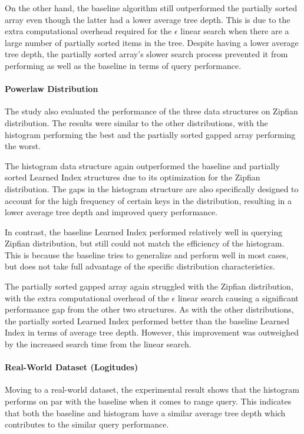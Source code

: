 \documentclass[11pt,a4paper]{article}
\newcommand{\learnindex}{\textsf{Learned Index}\xspace}
\begin{document}
On the other hand, the baseline algorithm still outperformed the partially sorted array even though the latter had a lower average tree depth. This is due to the extra computational overhead required for the $\epsilon$ linear search when there are a large number of partially sorted items in the tree. Despite having a lower average tree depth, the partially sorted array's slower search process prevented it from performing as well as the baseline in terms of query performance.

\paragraph{Powerlaw Distribution}
The study also evaluated the performance of the three data structures on Zipfian distribution. The results were similar to the other distributions, with the histogram performing the best and the partially sorted gapped array performing the worst.

The histogram data structure again outperformed the baseline and partially sorted \learnindex structures due to its optimization for the Zipfian distribution. The gaps in the histogram structure are also specifically designed to account for the high frequency of certain keys in the distribution, resulting in a lower average tree depth and improved query performance.

In contrast, the baseline \learnindex performed relatively well in querying Zipfian distribution, but still could not match the efficiency of the histogram. This is because the baseline tries to generalize and perform well in most cases, but does not take full advantage of the specific distribution characteristics.

The partially sorted gapped array again struggled with the Zipfian distribution, with the extra computational overhead of the $\epsilon$ linear search causing a significant performance gap from the other two structures. As with the other distributions, the partially sorted \learnindex performed better than the baseline \learnindex in terms of average tree depth. However, this improvement was outweighed by the increased search time from the linear search.

\paragraph{Real-World Dataset (Logitudes)}
Moving to a real-world dataset, the experimental result shows that the histogram performs on par with the baseline when it comes to range query. This indicates that both the baseline and histogram have a similar average tree depth which contributes to the similar query performance.
\end{document}
